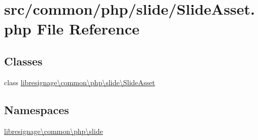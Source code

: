 \hypertarget{SlideAsset_8php}{}\section{src/common/php/slide/\+Slide\+Asset.php File Reference}
\label{SlideAsset_8php}
\subsection*{Classes}
\begin{DoxyCompactItemize}
\item 
class \hyperlink{classlibresignage_1_1common_1_1php_1_1slide_1_1SlideAsset}{libresignage\textbackslash{}common\textbackslash{}php\textbackslash{}slide\textbackslash{}\+Slide\+Asset}
\end{DoxyCompactItemize}
\subsection*{Namespaces}
\begin{DoxyCompactItemize}
\item 
 \hyperlink{namespacelibresignage_1_1common_1_1php_1_1slide}{libresignage\textbackslash{}common\textbackslash{}php\textbackslash{}slide}
\end{DoxyCompactItemize}
